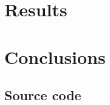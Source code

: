 \documentclass{scrreprt}
\begin{document}
\chapter{Results}

\chapter{Conclusions}




\newpage
\begin{appendices}

\chapter{Source code}

\end{appendices}
\end{document}

